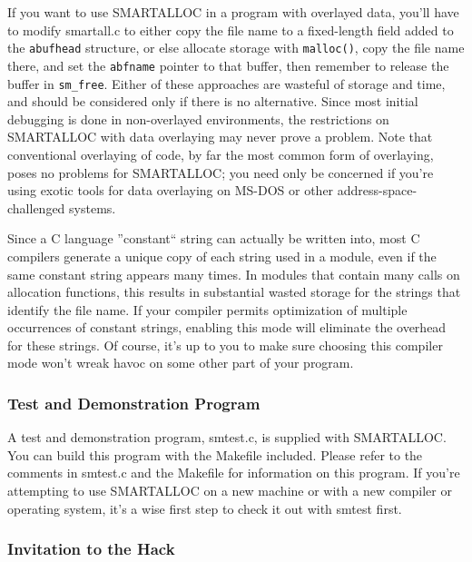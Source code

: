 If you want to use SMARTALLOC in a program with overlayed data, you'll have to
modify smartall.c to either copy the file name to a fixed-length field added
to the {\tt abufhead} structure, or else allocate storage with {\tt malloc()},
copy the file name there, and set the {\tt abfname} pointer to that buffer,
then remember to release the buffer in {\tt sm\_free}. Either of these
approaches are wasteful of storage and time, and should be considered only if
there is no alternative. Since most initial debugging is done in non-overlayed
environments, the restrictions on SMARTALLOC with data overlaying may never
prove a problem. Note that conventional overlaying of code, by far the most
common form of overlaying, poses no problems for SMARTALLOC; you need only be
concerned if you're using exotic tools for data overlaying on MS-DOS or other
address-space-challenged systems. 

Since a C language ''constant`` string can actually be written into, most C
compilers generate a unique copy of each string used in a module, even if the
same constant string appears many times. In modules that contain many calls on
allocation functions, this results in substantial wasted storage for the
strings that identify the file name. If your compiler permits optimization of
multiple occurrences of constant strings, enabling this mode will eliminate
the overhead for these strings. Of course, it's up to you to make sure
choosing this compiler mode won't wreak havoc on some other part of your
program. 

\subsubsection*{ Test and Demonstration Program}

A test and demonstration program, smtest.c, is supplied with SMARTALLOC. You
can build this program with the Makefile included. Please refer to the
comments in smtest.c and the Makefile for information on this program. If
you're attempting to use SMARTALLOC on a new machine or with a new compiler or
operating system, it's a wise first step to check it out with smtest first. 

\subsubsection*{ Invitation to the Hack}


